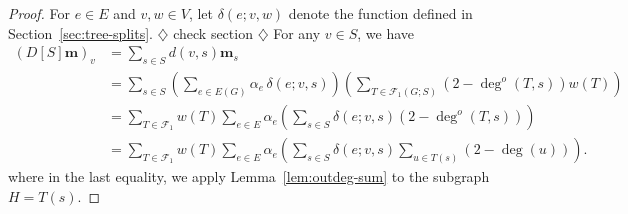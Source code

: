 \documentclass{amsart}
\theoremstyle{definition}
\newcommand{\boldm}{\mathbf{m}}
\newcommand{\trees}{\mathcal{F}_1}
\newcommand{\degout}{\deg^o}
\newcommand{\note}[1]{{\color{red} \sf $\diamondsuit$  {#1} $\diamondsuit$ }}
\begin{document}
\begin{proof}
For $e\in E$ and $v,w\in V$, let $\delta(e;v,w)$ denote the function defined in Section~\ref{sec:tree-splits}. \note{check section}
For any $v \in S$, we have
\begin{align}
  (D[S] \boldm)_v &= \sum_{s \in S} d(v,s) \boldm_s \\
  &= \sum_{s \in S} \left( \sum_{e \in E(G)} \alpha_e\, \delta(e; v,s) \right) \left( \sum_{T \in \trees(G;S)} (2 - \degout(T,s)) w(T) \right) \\
  &= \sum_{T\in \trees} w(T) \sum_{e\in E} \alpha_e \left( \sum_{s \in S} \delta(e; v,s) (2 - \deg^o(T, s)) \right) \\
  &= \sum_{T \in \trees} w(T) \sum_{e \in E} \alpha_e \left( \sum_{s \in S} \delta(e; v,s) \sum_{u \in T(s)} (2 - \deg(u)) \right). \label{eq:14-1}
\end{align}
where in the last equality, we apply Lemma~\ref{lem:outdeg-sum} to the subgraph $H = T(s)$.


\end{proof}
\end{document}
